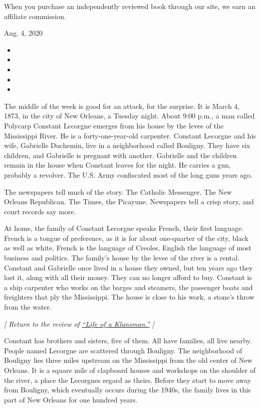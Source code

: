 When you purchase an independently reviewed book through our site, we
earn an affiliate commission.

Aug. 4, 2020

\begin{itemize}
\item
\item
\item
\item
\item
\end{itemize}

The middle of the week is good for an attack, for the surprise. It is
March 4, 1873, in the city of New Orleans, a Tuesday night. About 9:00
p.m., a man called Polycarp Constant Lecorgne emerges from his house by
the levee of the Mississippi River. He is a forty-one-year-old
carpenter. Constant Lecorgne and his wife, Gabrielle Duchemin, live in a
neighborhood called Bouligny. They have six children, and Gabrielle is
pregnant with another. Gabrielle and the children remain in the house
when Constant leaves for the night. He carries a gun, probably a
revolver. The U.S. Army confiscated most of the long guns years ago.

The newspapers tell much of the story. The Catholic Messenger. The New
Orleans Republican. The Times, the Picayune. Newspapers tell a crisp
story, and court records say more.

At home, the family of Constant Lecorgne speaks French, their first
language. French is a tongue of preference, as it is for about
one-quarter of the city, black as well as white. French is the language
of Creoles, English the language of most business and politics. The
family's house by the levee of the river is a rental. Constant and
Gabrielle once lived in a house they owned, but ten years ago they lost
it, along with all their money. They can no longer afford to buy.
Constant is a ship carpenter who works on the barges and steamers, the
passenger boats and freighters that ply the Mississippi. The house is
close to his work, a stone's throw from the water.

\emph{{[} Return to the review of}
\href{https://www.nytimes.com/2020/08/04/books/review/life-of-a-klansman-edward-ball.html}{\emph{``Life
of a Klansman.''}} \emph{{]}}

Constant has brothers and sisters, five of them. All have families, all
live nearby. People named Lecorgne are scattered through Bouligny. The
neighborhood of Bouligny lies three miles upstream on the Mississippi
from the old center of New Orleans. It is a square mile of clapboard
houses and workshops on the shoulder of the river, a place the Lecorgnes
regard as theirs. Before they start to move away from Bouligny, which
eventually occurs during the 1940s, the family lives in this part of New
Orleans for one hundred years.

